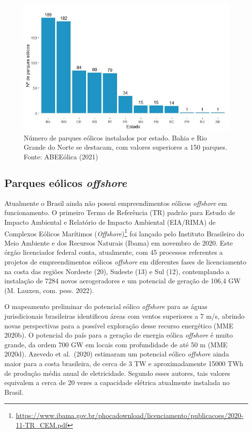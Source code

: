 \documentclass[
  oneside]{scrbook}
\DeclareRobustCommand{\href}[2]{#2\footnote{\url{#1}}}
\begin{document}
\begin{figure}[H]

{\centering \includegraphics[width=0.8\linewidth]{imagens/cap01/Figura_1.6_1} 

}

\caption{Número de parques eólicos instalados por estado. Bahia e Rio Grande do Norte se destacam, com valores superiores a 150 parques. Fonte: ABEEólica (2021)}\label{fig:06}
\end{figure}

\hypertarget{parques-euxf3licos-offshore}{%
\subsection{\texorpdfstring{Parques eólicos \emph{offshore}}{Parques eólicos offshore}}\label{parques-euxf3licos-offshore}}

Atualmente o Brasil ainda não possui empreendimentos eólicos \emph{offshore} em funcionamento. O primeiro \href{https://www.ibama.gov.br/phocadownload/licenciamento/publicacoes/2020-11-TR_CEM.pdf}{Termo de Referência (TR) padrão para Estudo de Impacto Ambiental e Relatório de Impacto Ambiental (EIA/RIMA) de Complexos Eólicos Marítimos (\emph{Offshore})} foi lançado pelo Instituto Brasileiro do Meio Ambiente e dos Recursos Naturais (Ibama) em novembro de 2020. Este órgão licenciador federal conta, atualmente, com 45 processos referentes a projetos de empreendimentos eólicos \emph{offshore} em diferentes fases de licenciamento na costa das regiões Nordeste (20), Sudeste (13) e Sul (12), contemplando a instalação de 7284 novos aerogeradores e um potencial de geração de 106,4 GW (M. Lauxen, com. pess. 2022).

O mapeamento preliminar do potencial eólico \emph{offshore} para as águas jurisdicionais brasileiras identificou áreas com ventos superiores a 7 m/s, abrindo novas perspectivas para a possível exploração desse recurso energético (MME 2020b). O potencial do país para a geração de energia eólica \emph{offshore} é muito grande, da ordem 700 GW em locais com profundidade de até 50 m (MME 2020d). Azevedo et al.~(2020) estimaram um potencial eólico \emph{offshore} ainda maior para a costa brasileira, de cerca de 3 TW e aproximadamente 15000 TWh de produção média anual de eletricidade. Segundo esses autores, tais valores equivalem a cerca de 20 vezes a capacidade elétrica atualmente instalada no Brasil.
\end{document}
